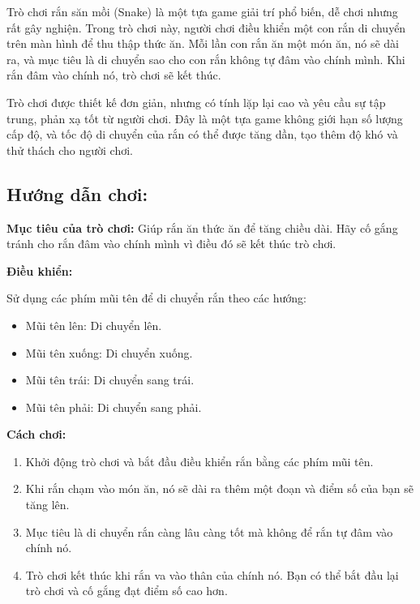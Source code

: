\documentclass[a4paper, 12pt]{article}
\begin{document}
Trò chơi rắn săn mồi (Snake) là một tựa game giải trí phổ biến, dễ chơi nhưng rất gây nghiện. Trong trò chơi này, người chơi điều khiển một con rắn di chuyển trên màn hình để thu thập thức ăn. Mỗi lần con rắn ăn một món ăn, nó sẽ dài ra, và mục tiêu là di chuyển sao cho con rắn không tự đâm vào chính mình. Khi rắn đâm vào chính nó, trò chơi sẽ kết thúc.

Trò chơi được thiết kế đơn giản, nhưng có tính lặp lại cao và yêu cầu sự tập trung, phản xạ tốt từ người chơi. Đây là một tựa game không giới hạn số lượng cấp độ, và tốc độ di chuyển của rắn có thể được tăng dần, tạo thêm độ khó và thử thách cho người chơi.

\subsection{Hướng dẫn chơi:}

\begin{itemize}
\textbf{Mục tiêu của trò chơi:} Giúp rắn ăn thức ăn để tăng chiều dài. Hãy cố gắng tránh cho rắn đâm vào chính mình vì điều đó sẽ kết thúc trò chơi.
\end{itemize}

\textbf{Điều khiển:}

Sử dụng các phím mũi tên để di chuyển rắn theo các hướng:

\begin{itemize}
    \item Mũi tên lên: Di chuyển lên.

    \item Mũi tên xuống: Di chuyển xuống.

    \item Mũi tên trái: Di chuyển sang trái.

    \item Mũi tên phải: Di chuyển sang phải.
\end{itemize}

\textbf{Cách chơi:}

\begin{enumerate}
    \item Khởi động trò chơi và bắt đầu điều khiển rắn bằng các phím mũi tên.

    \item Khi rắn chạm vào món ăn, nó sẽ dài ra thêm một đoạn và điểm số của bạn sẽ tăng lên.

    \item Mục tiêu là di chuyển rắn càng lâu càng tốt mà không để rắn tự đâm vào chính nó.

    \item Trò chơi kết thúc khi rắn va vào thân của chính nó. Bạn có thể bắt đầu lại trò chơi và cố gắng đạt điểm số cao hơn.
\end{enumerate}
\end{document}
